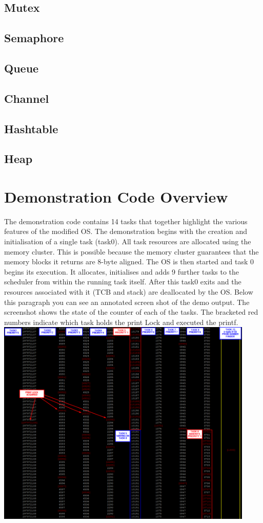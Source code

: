 \documentclass[12pt,a4paper]{article}
\begin{document}
\subsection{Mutex}
\subsection{Semaphore}
\subsection{Queue}
\subsection{Channel}
\subsection{Hashtable}
\subsection{Heap}

\pagebreak
\section{Demonstration Code Overview}
The demonstration code contains 14 tasks that together highlight the various features of the modified OS. The demonstration begins with the creation and initialisation of a single task (task0). All task resources are allocated using the memory cluster. This is possible because the memory cluster guarantees that the memory blocks it returns are 8-byte aligned. The OS is then started and task 0 begins its execution. It allocates, initialises and adds 9 further tasks to the scheduler from within the running task itself. After this task0 exits and the resources associated with it (TCB and stack) are deallocated by the OS. Below this paragraph you can see an annotated screen shot of the demo output. The screenshot shows the state of the counter of each of the tasks. The bracketed red numbers indicate which task holds the print Lock and executed the printf.\\

\includegraphics[width=0.92\textwidth]{images/priorityInheritance.png}\\
\end{document}
